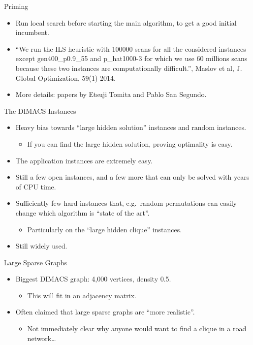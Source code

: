 \documentclass[aspectratio=169,compress,10pt]{beamer}
\begin{document}
\begin{frame}{Priming}
    \begin{itemize}
        \item Run local search before starting the main algorithm, to get a good initial incumbent.
        \item ``We run the ILS heuristic with 100000 scans for all the considered instances except
            gen400\_p0.9\_55 and p\_hat1000-3 for which we use 60 millions scans because these two
            instances are computationally difficult.'', Maslov et al, J. Global Optimization, 59(1)
            2014.
        \item More details: papers by Etsuji Tomita and Pablo San Segundo.
    \end{itemize}
\end{frame}

\begin{frame}{The DIMACS Instances}
    \begin{itemize}
        \item Heavy bias towards ``large hidden solution'' instances and random instances.
            \begin{itemize}
                \item If you can find the large hidden solution, proving optimality is easy.
            \end{itemize}
        \item The application instances are extremely easy.
        \item Still a few open instances, and a few more that can only be solved with years of CPU
            time.
        \item Sufficiently few hard instances that, e.g.\ random permutations can easily change which
            algorithm is ``state of the art''.
            \begin{itemize}
                \item Particularly on the ``large hidden clique'' instances.
            \end{itemize}
        \item Still widely used.
    \end{itemize}
\end{frame}

\begin{frame}{Large Sparse Graphs}
    \begin{itemize}
        \item Biggest DIMACS graph: 4,000 vertices, density 0.5.
            \begin{itemize}
                \item This will fit in an adjacency matrix.
            \end{itemize}
        \item Often claimed that large sparse graphs are ``more realistic''.
            \begin{itemize}
                \item Not immediately clear why anyone would want to find a clique in a road
                    network\ldots
            \end{itemize}
    \end{itemize}
\end{frame}
\end{document}
